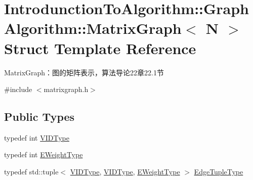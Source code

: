 \hypertarget{struct_introdunction_to_algorithm_1_1_graph_algorithm_1_1_matrix_graph}{}\section{Introdunction\+To\+Algorithm\+:\+:Graph\+Algorithm\+:\+:Matrix\+Graph$<$ N $>$ Struct Template Reference}
\label{struct_introdunction_to_algorithm_1_1_graph_algorithm_1_1_matrix_graph}


Matrix\+Graph：图的矩阵表示，算法导论22章22.1节  




{\ttfamily \#include $<$matrixgraph.\+h$>$}

\subsection*{Public Types}
\begin{DoxyCompactItemize}
\item 
typedef int \hyperlink{struct_introdunction_to_algorithm_1_1_graph_algorithm_1_1_matrix_graph_ae00582b52cc9f015cb9b1b8f4d521776}{V\+I\+D\+Type}
\item 
typedef int \hyperlink{struct_introdunction_to_algorithm_1_1_graph_algorithm_1_1_matrix_graph_af2d243f2c1bb8a101aa3f71f469c64e8}{E\+Weight\+Type}
\item 
typedef std\+::tuple$<$ \hyperlink{struct_introdunction_to_algorithm_1_1_graph_algorithm_1_1_matrix_graph_ae00582b52cc9f015cb9b1b8f4d521776}{V\+I\+D\+Type}, \hyperlink{struct_introdunction_to_algorithm_1_1_graph_algorithm_1_1_matrix_graph_ae00582b52cc9f015cb9b1b8f4d521776}{V\+I\+D\+Type}, \hyperlink{struct_introdunction_to_algorithm_1_1_graph_algorithm_1_1_matrix_graph_af2d243f2c1bb8a101aa3f71f469c64e8}{E\+Weight\+Type} $>$ \hyperlink{struct_introdunction_to_algorithm_1_1_graph_algorithm_1_1_matrix_graph_a73af3fee951b91b4f5c48422460f8c03}{Edge\+Tuple\+Type}
\end{DoxyCompactItemize}
